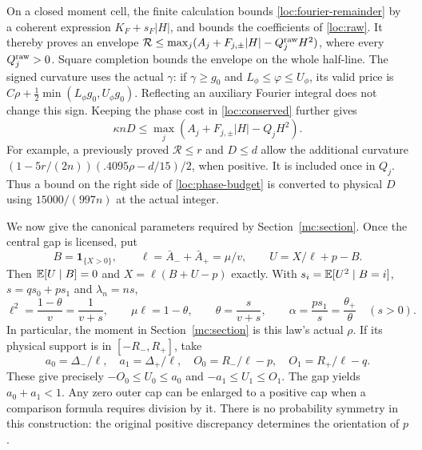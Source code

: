 On a closed moment cell, the finite calculation bounds
\eqref{loc:fourier-remainder} by a coherent expression
$K_F+s_F|H|$, and bounds the coefficients of \eqref{loc:raw}.
It thereby proves an envelope
$\mathcal R\le\max_j(A_j+F_{j,\pm}|H|-Q_j^{\rm raw}H^2)$,
where every $Q_j^{\rm raw}>0$.
Square completion bounds the envelope on the whole half-line.
The signed curvature uses the actual $\gamma$: if
$\gamma\ge g_0$ and $L_\phi\le\varphi\le U_\phi$, its valid price is
$C\rho+\tfrac12\min(L_\phi g_0,U_\phi g_0)$.
Reflecting an auxiliary Fourier integral does not change this sign.
Keeping the phase cost in \eqref{loc:conserved} further gives
\begin{equation}\label{loc:phase-budget}
 \kappa nD\le\max_j(A_j+F_{j,\pm}|H|-Q_jH^2).
\end{equation}
For example, a previously proved $\mathcal R\le r$ and $D\le d$
allow the additional curvature
$(1-5r/(2n))( .4095\rho-d/15)/2$, when positive.
It is included once in $Q_j$.
Thus a bound on the right side of \eqref{loc:phase-budget} is converted
to physical $D$ using $15000/(997n)$ at the actual integer.

We now give the canonical parameters required by
Section~\ref{mc:section}. Once the central gap is licensed, put
\begin{equation}\label{loc:canonical}
 B=\mathbf1_{\{X>0\}},\qquad
 \ell=\bar A_-+\bar A_+=\mu/v,\qquad
 U=X/\ell+p-B.
\end{equation}
Then $\mathbb E[U\mid B]=0$ and $X=\ell(B+U-p)$ exactly.
With $s_i=\mathbb E[U^2\mid B=i]$, $s=qs_0+ps_1$ and $\lambda_n=ns$,
\begin{equation}\label{loc:canonical-identities}
 \ell^2=\frac{1-\theta}{v}=\frac1{v+s},\qquad
 \mu\ell=1-\theta,\qquad
 \theta=\frac{s}{v+s},\qquad
 \alpha=\frac{ps_1}{s}=\frac{\theta_+}{\theta}\quad(s>0).
\end{equation}
In particular, the moment in Section~\ref{mc:section} is this law's
actual $\rho$. If its physical support is in $[-R_-,R_+]$, take
\begin{equation}\label{loc:conditional-support}
 a_0=\Delta_-/\ell,\quad a_1=\Delta_+/\ell,\quad
 O_0=R_-/\ell-p,\quad O_1=R_+/\ell-q.
\end{equation}
These give precisely $-O_0\le U_0\le a_0$ and
$-a_1\le U_1\le O_1$. The gap yields $a_0+a_1<1$.
Any zero outer cap can be enlarged to a positive cap when a comparison
formula requires division by it.
There is no probability symmetry in this construction: the original
positive discrepancy determines the orientation of $p$.

